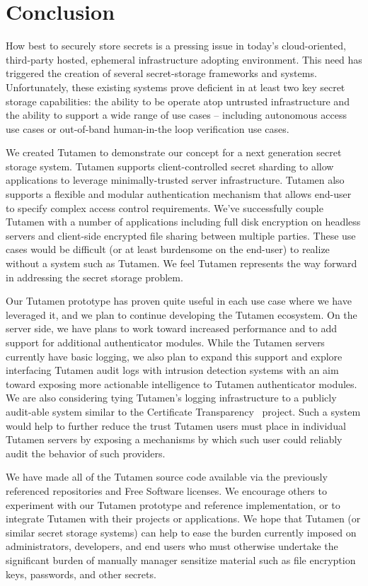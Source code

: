 \section{Conclusion}
\label{sec:conclusion}

How best to securely store secrets is a pressing issue in today's
cloud-oriented, third-party hosted, ephemeral infrastructure adopting
environment. This need has triggered the creation of several
secret-storage frameworks and systems. Unfortunately, these existing
systems prove deficient in at least two key secret storage
capabilities: the ability to be operate atop untrusted infrastructure
and the ability to support a wide range of use cases -- including
autonomous access use cases or out-of-band human-in-the loop
verification use cases.

We created Tutamen to demonstrate our concept for a next generation
secret storage system. Tutamen supports client-controlled secret
sharding to allow applications to leverage minimally-trusted server
infrastructure. Tutamen also supports a flexible and modular
authentication mechanism that allows end-user to specify complex
access control requirements. We've successfully couple Tutamen with a
number of applications including full disk encryption on headless
servers and client-side encrypted file sharing between multiple
parties. These use cases would be difficult (or at least burdensome on
the end-user) to realize without a system such as Tutamen. We feel
Tutamen represents the way forward in addressing the secret storage
problem.

Our Tutamen prototype has proven quite useful in each use case where
we have leveraged it, and we plan to continue developing the Tutamen
ecosystem. On the server side, we have plans to work toward increased
performance and to add support for additional authenticator
modules. While the Tutamen servers currently have basic logging, we
also plan to expand this support and explore interfacing Tutamen audit
logs with intrusion detection systems with an aim toward exposing more
actionable intelligence to Tutamen authenticator modules. We are also
considering tying Tutamen's logging infrastructure to a publicly
audit-able system similar to the Certificate
Transparency~\cite{laurie2013} project. Such a system would help to
further reduce the trust Tutamen users must place in individual
Tutamen servers by exposing a mechanisms by which such user could
reliably audit the behavior of such providers.

We have made all of the Tutamen source code available via the
previously referenced repositories and Free Software licenses. We
encourage others to experiment with our Tutamen prototype and
reference implementation, or to integrate Tutamen with their projects
or applications. We hope that Tutamen (or similar secret storage
systems) can help to ease the burden currently imposed on
administrators, developers, and end users who must otherwise undertake
the significant burden of manually manager sensitize material such as
file encryption keys, passwords, and other secrets.

